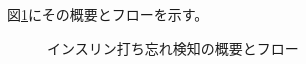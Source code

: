 図\ref{fig:insulin_design}にその概要とフローを示す。

\begin{figure}
  \caption{インスリン打ち忘れ検知の概要とフロー}
  \label{fig:insulin_design}
  \begin{center}
  \end{center}
\end{figure}


